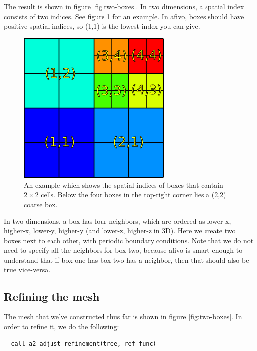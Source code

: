\documentclass[a4paper, a4wide]{article}
\begin{document}
The result is shown in figure \ref{fig:two-boxes}.
In two dimensions, a spatial index consists of two indices.
See figure \ref{fig:box-indices} for an example.
In afivo, boxes should have positive spatial indices, so (1,1) is the lowest
index you can give.

\begin{figure}
  \centering
  \includegraphics[width=7.5cm]{figures/box_indices.png}
  \caption{An example which shows the spatial indices of boxes that contain
    $2 \times 2$ cells.
    Below the four boxes in the top-right corner lies a (2,2) coarse box.}
  \label{fig:box-indices}
\end{figure}

In two dimensions, a box has four neighbors, which are ordered as lower-x,
higher-x, lower-y, higher-y (and lower-z, higher-z in 3D).
Here we create two boxes next to each other, with periodic boundary conditions.
Note that we do not need to specify all the neighbors for box two, because afivo
is smart enough to understand that if box one has box two has a neighbor, then
that should also be true vice-versa.

\subsection{Refining the mesh}
\label{sec:refining-mesh}

The mesh that we've constructed thus far is shown in figure \ref{fig:two-boxes}.
In order to refine it, we do the following:
\begin{lstlisting}
  call a2_adjust_refinement(tree, ref_func)
\end{lstlisting}
\end{document}
